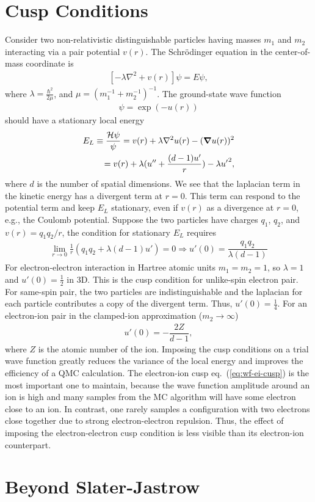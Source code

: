 \section{Cusp Conditions}
Consider two non-relativistic distinguishable particles having masses $m_1$ and $m_2$ interacting via a pair potential $v(r)$. The Schr\"odinger equation in the center-of-mass coordinate is
\begin{align}
\left[-\lambda\nabla^2 + v(r)\right] \psi = E\psi,
\end{align}
where $\lambda=\frac{\hbar^2}{2\mu}$, and $\mu=(m_1^{-1}+m_2^{-1})^{-1}$. The ground-state wave function
\begin{align}
\psi = \exp(-u(r))
\end{align}
should have a stationary local energy
\begin{align} \label{eq:wf-cusp}
E_L \equiv \dfrac{\mathcal{H}\psi}{\psi} = v(r) + \lambda\nabla^2u(r) - (\boldsymbol{\nabla}u(r))^2 \nonumber \\
= v(r) + \lambda (u''+\frac{(d-1)u'}{r}) - \lambda {u'}^2,
\end{align}
where $d$ is the number of spatial dimensions.
We see that the laplacian term in the kinetic energy has a divergent term at $r=0$.
This term can respond to the potential term and keep $E_L$ stationary, even if $v(r)$ as a divergence at $r=0$, e.g., the Coulomb potential. Suppose the two particles have charges $q_1$, $q_2$, and $v(r)=q_1q_2/r$, the condition for stationary $E_L$ requires
\begin{align}
\lim\limits_{r\rightarrow 0}\frac{1}{r} (q_1q_2+ \lambda (d-1) u')=0 \Rightarrow u'(0) = \dfrac{q_1q_2}{\lambda (d-1)}
\end{align}
For electron-electron interaction in Hartree atomic units $m_1=m_2=1$, so $\lambda=1$ and $u'(0)=\frac{1}{2}$ in 3D. This is the cusp condition for unlike-spin electron pair. For same-spin pair, the two particles are indistinguishable and the laplacian for each particle contributes a copy of the divergent term. Thus, $u'(0)=\frac{1}{4}$. For an electron-ion pair in the clamped-ion approximation ($m_2\rightarrow\infty$)
\begin{align} \label{eq:wf-ei-cusp}
u'(0) = -\dfrac{2Z}{d-1},
\end{align}
where $Z$ is the atomic number of the ion. Imposing the cusp conditions on a trial wave function greatly reduces the variance of the local energy and improves the efficiency of a QMC calculation. The electron-ion cusp eq.~(\ref{eq:wf-ei-cusp}) is the most important one to maintain, because the wave function amplitude around an ion is high and many samples from the MC algorithm will have some electron close to an ion. In contrast, one rarely samples a configuration with two electrons close together due to strong electron-electron repulsion. Thus, the effect of imposing the electron-electron cusp condition is less visible than its electron-ion counterpart.






\section{Beyond Slater-Jastrow}
